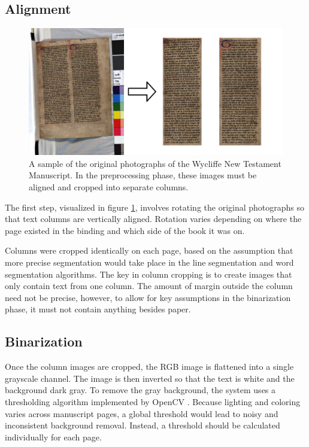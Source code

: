 \documentclass[final]{ukthesis}
\begin{document}
\subsection{Alignment}

\begin{figure}[t]
\begin{center}
\includegraphics[width=14cm]{rotate-crop}
\end{center}
\caption{A sample of the original photographs of the Wycliffe New Testament Manuscript. In the preprocessing phase, these images must be aligned and cropped into separate columns.}
\label{fig:rotate-crop}
\end{figure}
The first step, visualized in figure \ref{fig:rotate-crop}, involves rotating the original photographs so that text columns are vertically aligned. Rotation varies depending on where the page existed in the binding and which side of the book it was on.

Columns were cropped identically on each page, based on the assumption that more precise segmentation would take place in the line segmentation and word segmentation algorithms. The key in column cropping is to create images that only contain text from one column. The amount of margin outside the column need not be precise, however, to allow for key assumptions in the binarization phase, it must not contain anything besides paper.


\subsection{Binarization}
Once the column images are cropped, the RGB image is flattened into a single grayscale channel. The image is then inverted so that the text is white and the background dark gray. To remove the gray background, the system uses a thresholding algorithm implemented by OpenCV \cite{bradski2000opencv}. Because lighting and coloring varies across manuscript pages, a global threshold would lead to noisy and inconsistent background removal. Instead, a threshold should be calculated individually for each page.
\end{document}
